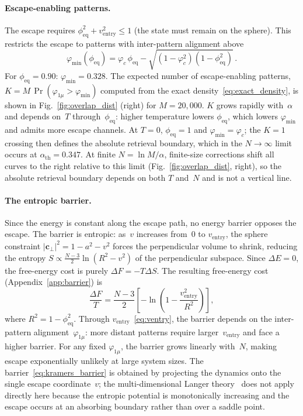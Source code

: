 \documentclass[11pt]{article}
\begin{document}
\paragraph{Escape-enabling patterns.}
The escape requires $\phi_{\mathrm{eq}}^2 + v_{\mathrm{entry}}^2 \leq 1$ (the state must remain on the sphere).  This restricts the escape to patterns with inter-pattern alignment above
\begin{equation}
\varphi_{\min}(\phi_{\mathrm{eq}}) = \varphi_c\,\phi_{\mathrm{eq}} - \sqrt{(1-\varphi_c^2)(1-\phi_{\mathrm{eq}}^2)}\,.
\label{eq:phi_min}
\end{equation}
For $\phi_{\mathrm{eq}} = 0.90$: $\varphi_{\min} = 0.328$.  The expected number of escape-enabling patterns, $K = M\,\Pr(\varphi_{1\mu} > \varphi_{\min})$ computed from the exact density~\eqref{eq:exact_density}, is shown in Fig.~\ref{fig:overlap_dist} (right) for $M = 20{,}000$.  $K$ grows rapidly with~$\alpha$ and depends on~$T$ through~$\phi_{\mathrm{eq}}$: higher temperature lowers $\phi_{\mathrm{eq}}$, which lowers $\varphi_{\min}$ and admits more escape channels.  At $T = 0$, $\phi_{\mathrm{eq}} = 1$ and $\varphi_{\min} = \varphi_c$; the $K = 1$ crossing then defines the absolute retrieval boundary, which in the $N \to \infty$ limit occurs at $\alpha_{\mathrm{th}} = 0.347$.  At finite $N = \ln M/\alpha$, finite-size corrections shift all curves to the right relative to this limit (Fig.~\ref{fig:overlap_dist}, right), so the absolute retrieval boundary depends on both $T$ and~$N$ and is not a vertical line.

\paragraph{The entropic barrier.}
Since the energy is constant along the escape path, no energy barrier opposes the escape.  The barrier is entropic: as~$v$ increases from~$0$ to $v_{\mathrm{entry}}$, the sphere constraint $|\mathbf{c}_\perp|^2 = 1 - a^2 - v^2$ forces the perpendicular volume to shrink, reducing the entropy $S \propto \tfrac{N{-}3}{2}\ln(R^2 - v^2)$ of the perpendicular subspace.  Since $\Delta E = 0$, the free-energy cost is purely $\Delta F = -T\Delta S$.  The resulting free-energy cost (Appendix~\ref{app:barrier}) is
\begin{equation}
\frac{\Delta F}{T} = \frac{N-3}{2}\left[-\ln\!\left(1 - \frac{v_{\mathrm{entry}}^2}{R^2}\right)\right],
\label{eq:kramers_barrier}
\end{equation}
where $R^2 = 1 - \phi_{\mathrm{eq}}^2$.  Through $v_{\mathrm{entry}}$~\eqref{eq:ventry}, the barrier depends on the inter-pattern alignment~$\varphi_{1\mu}$: more distant patterns require larger~$v_{\mathrm{entry}}$ and face a higher barrier.  For any fixed $\varphi_{1\mu}$, the barrier grows linearly with~$N$, making escape exponentially unlikely at large system sizes.  The barrier~\eqref{eq:kramers_barrier} is obtained by projecting the dynamics onto the single escape coordinate~$v$; the multi-dimensional Langer theory~\citep{langer1969,hanggi1990} does not apply directly here because the entropic potential is monotonically increasing and the escape occurs at an absorbing boundary rather than over a saddle point.
\end{document}
